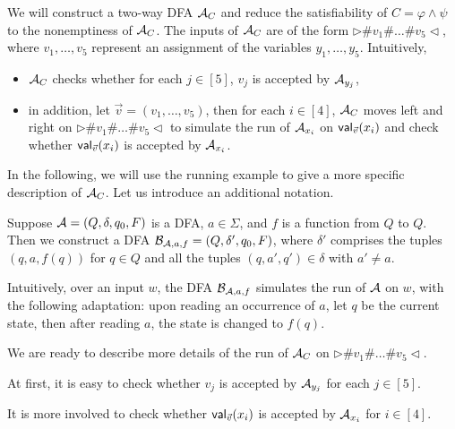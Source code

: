 \documentclass{llncs}
\begin{document}
We will construct a two-way DFA $\mathcal{A}_C$ and reduce the satisfiability of $C=\varphi \wedge \psi$ to the nonemptiness of $\mathcal{A}_C$. The inputs of $\mathcal{A}_C$ are of the form $\triangleright \# v_1 \# \dots \# v_5\triangleleft$, where $v_1,\dots, v_5$ represent an assignment of the variables $y_1,\dots, y_5$. Intuitively, 
\begin{itemize}
\item 
 $\mathcal{A}_C$ checks whether for each $j \in [5]$, $v_j$ is accepted by $\mathcal{A}_{y_j}$, 
\item 
in addition, let $\vec{v} = (v_1,\dots, v_5)$, then for each $i \in [4]$, $\mathcal{A}_C$ moves left and right on $\triangleright \# v_1 \# \dots \# v_5\triangleleft$ to simulate the run of $\mathcal{A}_{x_i}$ on $\mathsf{val}_{\vec{v}}(x_i)$ and check whether $\mathsf{val}_{\vec{v}}(x_i)$ is accepted by $\mathcal{A}_{x_i}$.
\end{itemize}

In the following, we will use the running example to give a more specific description of $\mathcal{A}_C$. Let us introduce an additional notation.

\begin{definition}[$\cB_{\cA, a, f}$]
Suppose $\mathcal{A}=(Q, \delta, q_0, F)$ is a DFA, $a \in \Sigma$, and $f$ is a function from $Q$ to $Q$. Then we construct a DFA $\mathcal{B}_{\mathcal{A}, a, f}=(Q, \delta', q_0, F)$, where $\delta'$ comprises the tuples $(q, a, f(q))$ for $q \in Q$ and all the tuples $(q, a', q') \in \delta$ with $a' \neq a$.
\end{definition}
Intuitively, over an input $w$, the DFA $\cB_{\cA, a, f}$ simulates the run of $\mathcal{A}$ on $w$, with the following adaptation: upon reading an occurrence of $a$, let $q$ be the current state, then after reading $a$, the state is changed to $f(q)$.


We are ready to describe more details of the run of $\mathcal{A}_C$ on $\triangleright \# v_1 \# \dots \# v_5\triangleleft$.

At first, it is easy to check whether $v_j$ is accepted by $\mathcal{A}_{y_j}$ for each $j \in [5]$.

It is more involved to check whether $\mathsf{val}_{\vec{v}}(x_i)$ is accepted by $\mathcal{A}_{x_i}$ for $i \in [4]$. 
\end{document}
